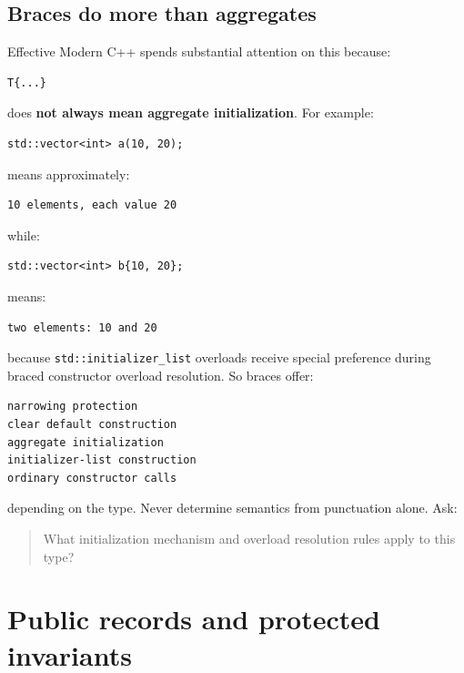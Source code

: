 \subsection{Braces do more than aggregates}\label{01-foundations-i-ch003-braces-do-more-than-aggregates}

Effective Modern C++ spends substantial attention on this because:

\begin{verbatim}
T{...}
\end{verbatim}

does \textbf{not always mean aggregate initialization}. For example:

\begin{verbatim}
std::vector<int> a(10, 20);
\end{verbatim}

means approximately:

\begin{verbatim}
10 elements, each value 20
\end{verbatim}

while:

\begin{verbatim}
std::vector<int> b{10, 20};
\end{verbatim}

means:

\begin{verbatim}
two elements: 10 and 20
\end{verbatim}

because \texttt{std::initializer\_list} overloads receive special preference during braced constructor overload resolution. So braces offer:

\begin{verbatim}
narrowing protection
clear default construction
aggregate initialization
initializer-list construction
ordinary constructor calls
\end{verbatim}

depending on the type. Never determine semantics from punctuation alone. Ask:

\begin{quote}
What initialization mechanism and overload resolution rules apply to this type?
\end{quote}

\section{Public records and protected invariants}\label{01-foundations-i-ch003-public-records-and-protected-invariants}

